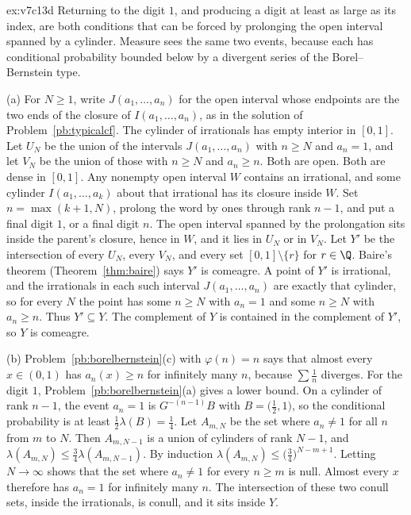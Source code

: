 \begin{solution}{ex:v7c13d}
\idea Returning to the digit $1$, and producing a digit at least as large as its index, are both conditions that can be forced by prolonging the open interval spanned by a cylinder. Measure sees the same two events, because each has conditional probability bounded below by a divergent series of the Borel--Bernstein type.

\writeup (a) For $N\ge 1$, write $J(a_1,\dots,a_n)$ for the open interval whose endpoints are the two ends of the closure of $I(a_1,\dots,a_n)$, as in the solution of Problem~\ref{pb:typicalcf}. The cylinder of irrationals has empty interior in $[0,1]$. Let $U_N$ be the union of the intervals $J(a_1,\dots,a_n)$ with $n\ge N$ and $a_n=1$, and let $V_N$ be the union of those with $n\ge N$ and $a_n\ge n$. Both are open. Both are dense in $[0,1]$. Any nonempty open interval $W$ contains an irrational, and some cylinder $I(a_1,\dots,a_k)$ about that irrational has its closure inside $W$. Set $n=\max(k+1,N)$, prolong the word by ones through rank $n-1$, and put a final digit $1$, or a final digit $n$. The open interval spanned by the prolongation sits inside the parent's closure, hence in $W$, and it lies in $U_N$ or in $V_N$. Let $Y'$ be the intersection of every $U_N$, every $V_N$, and every set $[0,1]\setminus\{r\}$ for $r\in\Q$. Baire's theorem (Theorem~\ref{thm:baire}) says $Y'$ is comeagre. A point of $Y'$ is irrational, and the irrationals in each such interval $J(a_1,\dots,a_n)$ are exactly that cylinder, so for every $N$ the point has some $n\ge N$ with $a_n=1$ and some $n\ge N$ with $a_n\ge n$. Thus $Y'\subseteq Y$. The complement of $Y$ is contained in the complement of $Y'$, so $Y$ is comeagre.

(b) Problem~\ref{pb:borelbernstein}(c) with $\varphi(n)=n$ says that almost every $x\in(0,1)$ has $a_n(x)\ge n$ for infinitely many $n$, because $\sum\frac1n$ diverges. For the digit $1$, Problem~\ref{pb:borelbernstein}(a) gives a lower bound. On a cylinder of rank $n-1$, the event $a_n=1$ is $G^{-(n-1)}B$ with $B=\bigl(\frac12,1\bigr)$, so the conditional probability is at least $\frac12\lambda(B)=\frac14$. Let $A_{m,N}$ be the set where $a_n\ne 1$ for all $n$ from $m$ to $N$. Then $A_{m,N-1}$ is a union of cylinders of rank $N-1$, and $\lambda(A_{m,N})\le\frac34\lambda(A_{m,N-1})$. By induction $\lambda(A_{m,N})\le\bigl(\frac34\bigr)^{N-m+1}$. Letting $N\to\infty$ shows that the set where $a_n\ne 1$ for every $n\ge m$ is null. Almost every $x$ therefore has $a_n=1$ for infinitely many $n$. The intersection of these two conull sets, inside the irrationals, is conull, and it sits inside $Y$.


\end{solution}
